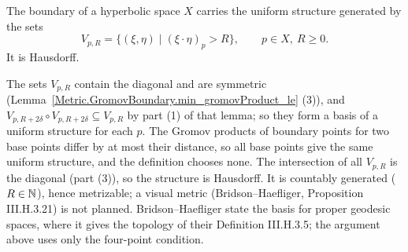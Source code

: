 \begin{definition}
  \label{Metric.GromovBoundary.instUniformSpace}
  The boundary of a hyperbolic space $X$ carries the uniform structure generated by the sets
  \[ V_{p, R} = \{(\xi, \eta) \mid (\xi \cdot \eta)_p > R\}, \qquad p \in X,\ R \ge 0. \]
  It is Hausdorff.
\end{definition}

The sets $V_{p, R}$ contain the diagonal and are symmetric
(Lemma~\ref{Metric.GromovBoundary.min_gromovProduct_le} (3)), and
$V_{p, R + 2\delta} \circ V_{p, R + 2\delta} \subseteq V_{p, R}$ by part (1) of that lemma; so they
form a basis of a uniform structure for each $p$. The Gromov products of boundary points for two
base points differ by at most their distance, so all base points give the same uniform structure,
and the definition chooses none. The intersection of all $V_{p, R}$ is the diagonal (part (3)), so
the structure is Hausdorff. It is countably generated ($R \in \mathbb{N}$), hence metrizable; a visual
metric (Bridson--Haefliger, Proposition III.H.3.21) is not planned. Bridson--Haefliger state the
basis for proper geodesic spaces, where it gives the topology of their Definition III.H.3.5; the
argument above uses only the four-point condition.
